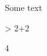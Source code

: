 \documentclass{article}
\begin{document}
Some text
\begin{Schunk}
\begin{Sinput}
> 2+2
\end{Sinput}
\begin{Soutput}
[1] 4
\end{Soutput}
\end{Schunk}
\end{document}

